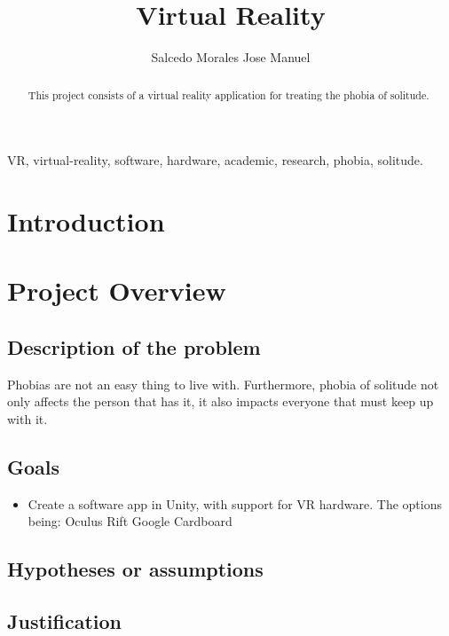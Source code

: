 \documentclass[preprint,12pt]{elsarticle}
\begin{document}
\begin{frontmatter}

\title{Virtual Reality}
\author{Salcedo Morales Jose Manuel}
\address{Tijuana, Baja California, Mexico}

\begin{abstract}
	This project consists of a virtual reality application for treating
	the phobia of solitude.
\end{abstract}

\begin{keyword}
VR, virtual-reality, software, hardware, academic, research, phobia, solitude.
\end{keyword}

\end{frontmatter}

\linenumbers

\newpage
\tableofcontents

\newpage
\section{Introduction}

\newpage
\section{Project Overview}
	\subsection{Description of the problem}
	Phobias are not an easy thing to live with. Furthermore, phobia of
	solitude not only affects the person that has it, it also impacts
	everyone that must keep up with it. \cite{Monophobia}
	\subsection{Goals}
	\begin{itemize}
		\item Create a software app in Unity, with support for VR
			hardware. The options being:
			\subitem Oculus Rift
			\subitem Google Cardboard
	\end{itemize}
	\subsection{Hypotheses or assumptions}
	\subsection{Justification}
\end{document}
